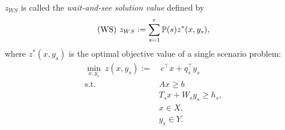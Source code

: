 %

$z_{WS}$ is called the \textit{wait-and-see solution value} defined by
\begin{align} \label{ws}
	\textrm{(WS) }z_{WS}:=\sum_{s=1}^r \operatorname*{\mathbb{P}}(s)z^*(x,y_s),
\end{align}
where $z^*(x,y_s)$ is the optimal objective value of a single scenario problem: 
\begin{subequations}
	\begin{align}
	\min_{x,y_s}\ z(x,y_s):=&\ c^\top x+q_s^\top y_s \label{ssp:obj}\\
	\mathrm{s.t.}\ &Ax \ge b \label{ssp:b}\\
	&T_s x + W_s y_s\ge h_s,  \label{ssp:c}\\
	&x\in X,  \label{ssp:d}\\
	&y_s \in Y. \label{ssp:e}
	\end{align}
\end{subequations}


